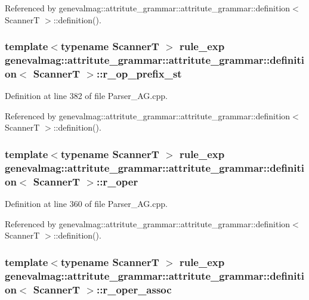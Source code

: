 Referenced by genevalmag::attritute\_\-grammar::attritute\_\-grammar::definition$<$ ScannerT $>$::definition().\hypertarget{structgenevalmag_1_1attritute__grammar_1_1definition_b05172d5352881f25db4b8bab46c2bb6}{
\subsubsection[{r\_\-op\_\-prefix\_\-st}]{\setlength{\rightskip}{0pt plus 5cm}template$<$typename ScannerT $>$ {\bf rule\_\-exp} genevalmag::attritute\_\-grammar::attritute\_\-grammar::definition$<$ ScannerT $>$::{\bf r\_\-op\_\-prefix\_\-st}}}
\label{structgenevalmag_1_1attritute__grammar_1_1definition_b05172d5352881f25db4b8bab46c2bb6}




Definition at line 382 of file Parser\_\-AG.cpp.

Referenced by genevalmag::attritute\_\-grammar::attritute\_\-grammar::definition$<$ ScannerT $>$::definition().\hypertarget{structgenevalmag_1_1attritute__grammar_1_1definition_7ddbfff75fd203c3f64d9ba828761e89}{
\subsubsection[{r\_\-oper}]{\setlength{\rightskip}{0pt plus 5cm}template$<$typename ScannerT $>$ {\bf rule\_\-exp} genevalmag::attritute\_\-grammar::attritute\_\-grammar::definition$<$ ScannerT $>$::{\bf r\_\-oper}}}
\label{structgenevalmag_1_1attritute__grammar_1_1definition_7ddbfff75fd203c3f64d9ba828761e89}




Definition at line 360 of file Parser\_\-AG.cpp.

Referenced by genevalmag::attritute\_\-grammar::attritute\_\-grammar::definition$<$ ScannerT $>$::definition().\hypertarget{structgenevalmag_1_1attritute__grammar_1_1definition_20ef9f89120fa4c053a9c8f5f83bc6af}{
\subsubsection[{r\_\-oper\_\-assoc}]{\setlength{\rightskip}{0pt plus 5cm}template$<$typename ScannerT $>$ {\bf rule\_\-exp} genevalmag::attritute\_\-grammar::attritute\_\-grammar::definition$<$ ScannerT $>$::{\bf r\_\-oper\_\-assoc}}}
\label{structgenevalmag_1_1attritute__grammar_1_1definition_20ef9f89120fa4c053a9c8f5f83bc6af}




